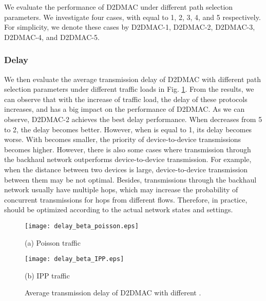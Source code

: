 \documentclass[journal]{IEEEtran}
\begin{document}
We evaluate the performance of D2DMAC under different path selection parameters. We investigate
four cases, with  equal to 1, 2, 3, 4, and 5 respectively. For simplicity, we denote these
cases by D2DMAC-1, D2DMAC-2, D2DMAC-3, D2DMAC-4, and D2DMAC-5.

\subsubsection{Delay}

We then evaluate the average transmission delay of D2DMAC with different path selection parameters
under different traffic loads in Fig. \ref{fig:delay_beta}. From the results, we can observe that
with the increase of traffic load, the delay of these protocols increases, and  has a big
impact on the performance of D2DMAC. As we can observe, D2DMAC-2 achieves the best delay
performance. When  decreases from 5 to 2, the delay becomes better. However, when  is
equal to 1, its delay becomes worse. With  becomes smaller, the priority of device-to-device
transmissions becomes higher. However, there is also some cases where transmission through the
backhaul network outperforms device-to-device transmission. For example, when the distance between
two devices is large, device-to-device transmission between them may be not optimal. Besides,
transmissions through the backhaul network usually have multiple hops, which may increase the
probability of concurrent transmissions for hops from different flows. Therefore, in practice,
 should be optimized according to the actual network states and settings.







\begin{figure}[htbp]
\begin{minipage}[t]{0.5\linewidth}
\centering
\texttt{[image: delay\_beta\_poisson.eps]}
\centerline{\small (a) Poisson traffic}
\end{minipage}\begin{minipage}[t]{0.5\linewidth}
\centering
\texttt{[image: delay\_beta\_IPP.eps]}
\centerline{\small (b) IPP traffic}
\end{minipage}\caption{Average transmission delay of D2DMAC with different .}
\label{fig:delay_beta} \vspace*{-3mm}
\end{figure}
\end{document}
